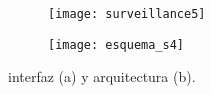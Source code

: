 \begin{figure}[h]
\centering
  \begin{subfigure}[]{110mm}
    \texttt{[image: surveillance5]}
  \end{subfigure}
  \hspace{5pt}
  \begin{subfigure}[]{110mm}
    \texttt{[image: esquema\_s4]}
  \end{subfigure}
  \caption{interfaz (a) y arquitectura (b).}\label{fig:surveillance5}
\end{figure}



